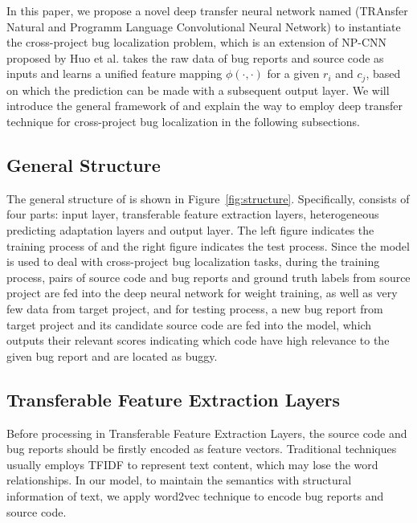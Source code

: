 In this paper, we propose a novel deep transfer neural network named \TRANPCNN (TRAnsfer Natural and Programm Language Convolutional Neural Network) to instantiate the cross-project bug localization problem, which is an extension of NP-CNN proposed by Huo et al. \TRANPCNN takes the raw data of bug reports and source code as inputs and learns a unified feature mapping $\phi(\cdot, \cdot)$ for a given $r_i$ and $c_j$, based on which the prediction can be made with a subsequent output layer. We will introduce the general framework of \TRANPCNN and explain the way to employ deep transfer technique for cross-project bug localization in the following subsections.

\subsection{General Structure}
The general structure of \TRANPCNN is shown in Figure~\ref{fig:structure}. Specifically, \TRANPCNN consists of four parts: input layer, transferable feature extraction layers, heterogeneous predicting adaptation layers and output layer. The left figure indicates the training process of \TRANPCNN and the right figure indicates the test process. Since the \TRANPCNN model is used to deal with cross-project bug localization tasks, during the training process, pairs of source code and bug reports and ground truth labels from source project are fed into the deep neural network for weight training, as well as very few data from target project, and for testing process, a new bug report from target project and its candidate source code are fed into the model, which outputs their relevant scores indicating which code have high relevance to the given bug report and are located as buggy.



\subsection{Transferable Feature Extraction Layers}
Before processing in Transferable Feature Extraction Layers, the source code and bug reports should be firstly encoded as feature vectors. Traditional techniques usually employs TFIDF to represent text content, which may lose the word relationships. In our model, to maintain the semantics with structural information of text, we apply word2vec technique to encode bug reports and source code.

